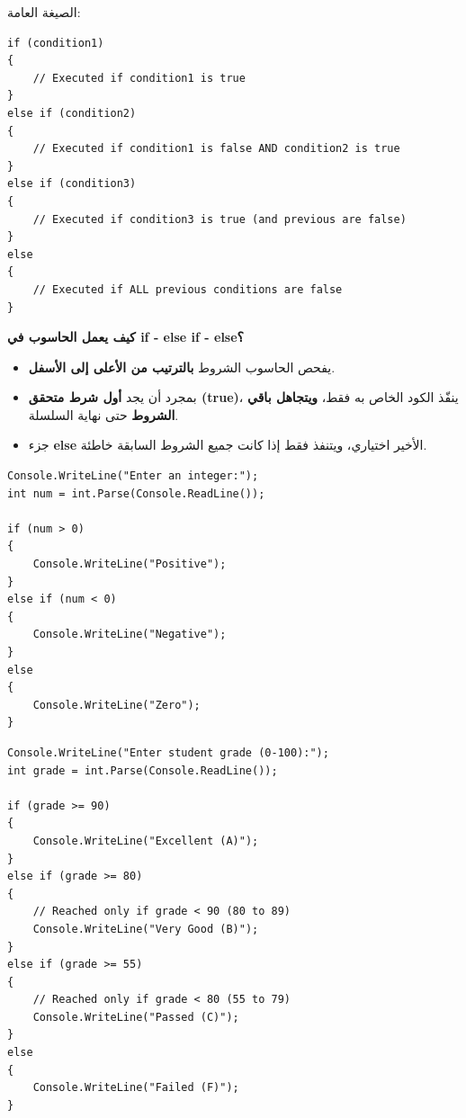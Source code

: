 \documentclass[14pt]{extarticle}
\begin{document}
الصيغة العامة:
\begin{boxCode}
\begin{english}
\begin{verbatim}
if (condition1)
{
    // Executed if condition1 is true
}
else if (condition2)
{
    // Executed if condition1 is false AND condition2 is true
}
else if (condition3)
{
    // Executed if condition3 is true (and previous are false)
}
else
{
    // Executed if ALL previous conditions are false
}
\end{verbatim}
\end{english}
\end{boxCode}

\begin{boxAttention}
\textbf{كيف يعمل الحاسوب في \textenglish{if - else if - else}؟}
\begin{itemize}
    \item يفحص الحاسوب الشروط \textbf{بالترتيب من الأعلى إلى الأسفل}.
    \item بمجرد أن يجد \textbf{أول شرط متحقق (\textenglish{true})}، ينفّذ الكود الخاص به فقط، \textbf{ويتجاهل باقي الشروط} حتى نهاية السلسلة.
    \item جزء \textbf{\textenglish{else}} الأخير اختياري، ويتنفذ فقط إذا كانت جميع الشروط السابقة خاطئة.
\end{itemize}
\end{boxAttention}

\begin{boxExample}
\begin{english}
\begin{verbatim}
Console.WriteLine("Enter an integer:");
int num = int.Parse(Console.ReadLine());

if (num > 0)
{
    Console.WriteLine("Positive");
}
else if (num < 0)
{
    Console.WriteLine("Negative");
}
else
{
    Console.WriteLine("Zero");
}
\end{verbatim}
\end{english}
\end{boxExample}

\clearpage

\begin{boxExample}
\begin{english}
\begin{verbatim}
Console.WriteLine("Enter student grade (0-100):");
int grade = int.Parse(Console.ReadLine());

if (grade >= 90)
{
    Console.WriteLine("Excellent (A)");
}
else if (grade >= 80)
{
    // Reached only if grade < 90 (80 to 89)
    Console.WriteLine("Very Good (B)");
}
else if (grade >= 55)
{
    // Reached only if grade < 80 (55 to 79)
    Console.WriteLine("Passed (C)");
}
else
{
    Console.WriteLine("Failed (F)");
}
\end{verbatim}
\end{english}
\end{boxExample}
\end{document}
